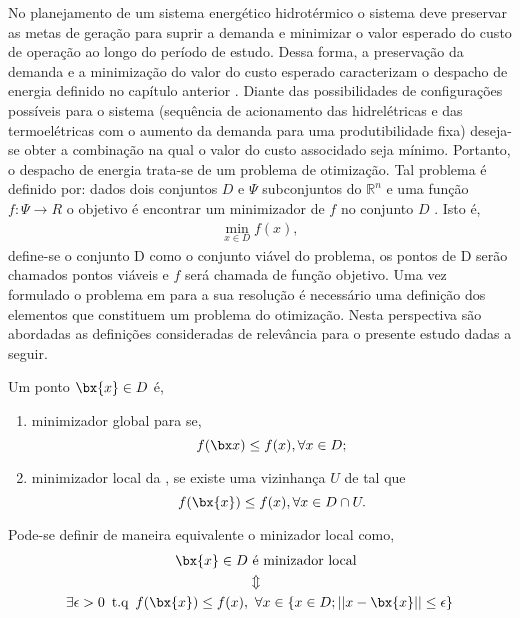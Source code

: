   No planejamento de um sistema energ\'etico hidrot\'ermico o sistema deve preservar as metas de gera\c c\~ao para suprir a demanda e minimizar o valor esperado do custo de
  opera\c c\~ao ao longo do per\'iodo de estudo. Dessa forma, a preserva\c c\~ao da demanda e a minimiza\c c\~ao do valor
  do custo esperado caracterizam o despacho de energia definido no cap\'itulo anterior
  . Diante das possibilidades de configura\c c\~oes poss\'iveis para o sistema (sequ\^encia de acionamento das hidrel\'etricas e das termoel\'etricas com o aumento da demanda para uma produtibilidade fixa) deseja-se obter a combina\c
  c\~ao na qual o valor do custo
  associdado seja m\'inimo. Portanto, o despacho de energia trata-se de um problema de otimiza\c c\~ao. Tal
  problema \'e definido por: dados dois conjuntos 
  $D $ e $\Psi$ subconjuntos do $\mathbb {R}^n$ e uma  fun\c c\~ao $f: \Psi
  \rightarrow R$ o objetivo \'e encontrar um minimizador de $f$ no conjunto $D$ \cite{alexey}. Isto \'e, 
  	\begin{align}%
		\label {obj}
	  	\min_{x\in D} f(x), 
	\end{align}
  define-se o conjunto D como o conjunto vi\'avel do problema, os pontos de D ser\~ao chamados pontos vi\'aveis e $f$ ser\'a chamada
  de fun\c c\~ao objetivo. Uma vez formulado o problema em  para a sua resolu\c c\~ao \'e necess\'ario uma
  defini\c c\~ao dos elementos que constituem um problema do otimiza\c c\~ao. Nesta perspectiva s\~ao abordadas as defini\c c\~oes
  consideradas de relev\^ancia para o presente estudo dadas a seguir.
  	\begin{defin}%
		\label{def1}
		Um ponto $\bx {x} \in D$ \'e, 
		\begin{enumerate}
			\item minimizador global para  se,
				$$ f(\bx x) \leq f(x), \forall x \in D;$$
			\item minimizador local da , se existe uma vizinhan\c ca $U$ de  tal que
				$$ f(\bx {x})\leq f(x), \forall x \in D \cap U.$$
		\end{enumerate}
	\end{defin}
  \noindent

 Pode-se definir de maneira equivalente o minizador local como,
 	\begin{align}%
		\label{eq2}
		{\bx {x} \in D} & \mbox{ \'e minizador local} \nonumber \\
	 	& \Updownarrow \\
	 	\exists  \epsilon > 0 \enspace \mbox{t.q} \enspace f(\bx {x}) \leq f(x), & \enspace \forall x \in \{ x \in D; ||x -
	   	\bx{x}|| \leq \epsilon \} \nonumber 
  	\end{align}

